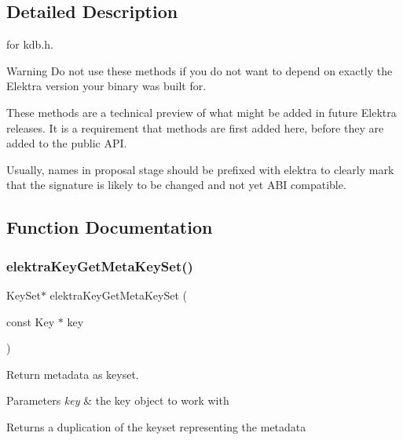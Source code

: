 \subsection{Detailed Description}
for kdb.\+h. 

\begin{DoxyWarning}{Warning}
Do not use these methods if you do not want to depend on exactly the Elektra version your binary was built for.
\end{DoxyWarning}
These methods are a technical preview of what might be added in future Elektra releases. It is a requirement that methods are first added here, before they are added to the public A\+PI.

Usually, names in proposal stage should be prefixed with elektra to clearly mark that the signature is likely to be changed and not yet A\+BI compatible. 

\subsection{Function Documentation}
\mbox{\label{group__api_ga48120f254e09e0c5cceff4864f110ceb}} 
\subsubsection{\texorpdfstring{elektraKeyGetMetaKeySet()}{elektraKeyGetMetaKeySet()}}
{\footnotesize\ttfamily Key\+Set$\ast$ elektra\+Key\+Get\+Meta\+Key\+Set (\begin{DoxyParamCaption}\item[{const Key $\ast$}]{key }\end{DoxyParamCaption})}



Return metadata as keyset. 


\begin{DoxyParams}{Parameters}
{\em key} & the key object to work with\\
\hline
\end{DoxyParams}
\begin{DoxyReturn}{Returns}
a duplication of the keyset representing the metadata 
\end{DoxyReturn}
\mbox{\label{group__api_ga812eb6c4f506dafa5733bf531c52199c}} 
